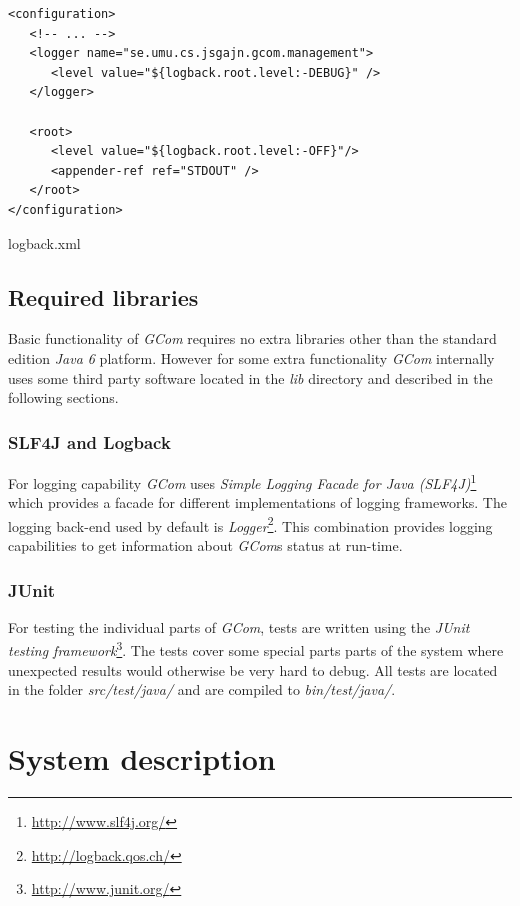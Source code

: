 \documentclass[titlepage, twocolumn, a4paper, 10pt]{article}
\begin{document}
\begin{code}
  \begin{footnotesize}
\begin{verbatim}
<configuration>
   <!-- ... -->
   <logger name="se.umu.cs.jsgajn.gcom.management">
      <level value="${logback.root.level:-DEBUG}" />
   </logger>
   
   <root>
      <level value="${logback.root.level:-OFF}"/>
      <appender-ref ref="STDOUT" />
   </root>
</configuration>
\end{verbatim}
  \end{footnotesize}
  \caption{logback.xml}\label{code:logback}
\end{code}

\subsection{Required libraries}\label{sec:required-libraries}
Basic functionality of \textit{GCom} requires no extra libraries other
than the standard edition \textit{Java 6} platform. However for some
extra functionality \textit{GCom} internally uses some third party
software located in the \textit{lib} directory and described in the
following sections.

\subsubsection{SLF4J and Logback}\label{sec:logback}
For logging capability \textit{GCom} uses \textit{Simple Logging
  Facade for Java (SLF4J)}\footnote{\url{http://www.slf4j.org/}} which
provides a facade for different implementations of logging frameworks.
The logging back-end used by default is
\textit{Logger}\footnote{\url{http://logback.qos.ch/}}. This
combination provides logging capabilities to get information about
\textit{GCom}s status at run-time.

\subsubsection{JUnit}\label{sec:junit}
For testing the individual parts of \textit{GCom}, tests are written
using the \textit{JUnit testing
  framework}\footnote{\url{http://www.junit.org/}}. The tests cover
some special parts parts of the system where unexpected results would
otherwise be very hard to debug. All tests are located in the folder
\textit{src/test/java/} and are compiled to \textit{bin/test/java/}.

\section{System description}\label{sec:system}
\end{document}
